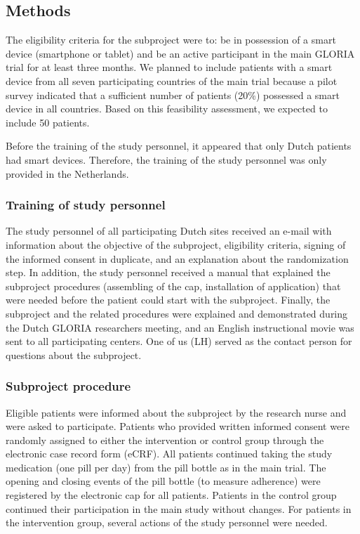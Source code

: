 \documentclass{article}
\begin{document}
\subsection{Methods}

The eligibility criteria for the subproject were to: be in possession of a smart device (smartphone or tablet) and be an active participant in the main GLORIA trial for at least three months. We planned to include patients with a smart device from all seven participating countries of the main trial because a pilot survey indicated that a sufficient number of patients (20\%) possessed a smart device in all countries. Based on this feasibility assessment, we expected to include 50 patients. 



Before the training of the study personnel, it appeared that only Dutch patients had smart devices. Therefore, the training of the study personnel was only provided in the Netherlands.



\subsubsection{Training of study personnel}

The study personnel of all participating Dutch sites received an e-mail with information about the objective of the subproject, eligibility criteria, signing of the informed consent in duplicate, and an explanation about the randomization step. In addition, the study personnel received a manual that explained the subproject procedures (assembling of the cap, installation of application) that were needed before the patient could start with the subproject. Finally, the subproject and the related procedures were explained and demonstrated during the Dutch GLORIA researchers meeting, and an English instructional movie was sent to all participating centers. One of us (LH) served as the contact person for questions about the subproject.



\subsubsection{Subproject procedure}

Eligible patients were informed about the subproject by the research nurse and were asked to participate. Patients who provided written informed consent were randomly assigned to either the intervention or control group through the electronic case record form (eCRF). All patients continued taking the study medication (one pill per day) from the pill bottle as in the main trial. The opening and closing events of the pill bottle (to measure adherence) were registered by the electronic cap for all patients. Patients in the control group continued their participation in the main study without changes. For patients in the intervention group, several actions of the study personnel were needed. 
\end{document}
